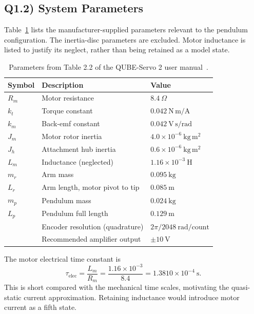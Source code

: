 \documentclass[11pt,a4paper]{article}
\begin{document}
\subsection*{Q1.2) System Parameters}

Table~\ref{tab:params} lists the manufacturer-supplied parameters relevant
to the pendulum configuration. The inertia-disc parameters are excluded.
Motor inductance is listed to justify its neglect, rather than being
retained as a model state.
\begin{table}[H]\centering
\caption{Parameters from Table 2.2 of the QUBE-Servo 2 user manual~\cite{qube_manual}.}
\label{tab:params}
\begin{tabular}{lll}
\toprule
\textbf{Symbol}&\textbf{Description}&\textbf{Value}\\
\midrule
$R_m$&Motor resistance&$8.4~\Omega$\\
$k_t$&Torque constant&$0.042~\mathrm{N\,m/A}$\\
$k_m$&Back-emf constant&$0.042~\mathrm{V\,s/rad}$\\
$J_m$&Motor rotor inertia&$4.0\times10^{-6}~\mathrm{kg\,m^2}$\\
$J_h$&Attachment hub inertia&$0.6\times10^{-6}~\mathrm{kg\,m^2}$\\
$L_m$&Inductance (neglected)&$1.16\times10^{-3}~\mathrm H$\\
$m_r$&Arm mass&$0.095~\mathrm{kg}$\\
$L_r$&Arm length, motor pivot to tip&$0.085~\mathrm m$\\
$m_p$&Pendulum mass&$0.024~\mathrm{kg}$\\
$L_p$&Pendulum full length&$0.129~\mathrm m$\\
&Encoder resolution (quadrature)&$2\pi/2048~\mathrm{rad/count}$\\
&Recommended amplifier output&$\pm10~\mathrm V$\\
\bottomrule
\end{tabular}
\end{table}
The motor electrical time constant is
\begin{equation}
\tau_{\mathrm{elec}}=\frac{L_m}{R_m}
=\frac{1.16\times10^{-3}}{8.4}
=1.3810\times10^{-4}~\mathrm s.
\end{equation}
This is short compared with the mechanical time scales, motivating the
quasi-static current approximation. Retaining inductance would introduce
motor current as a fifth state.
\end{document}
